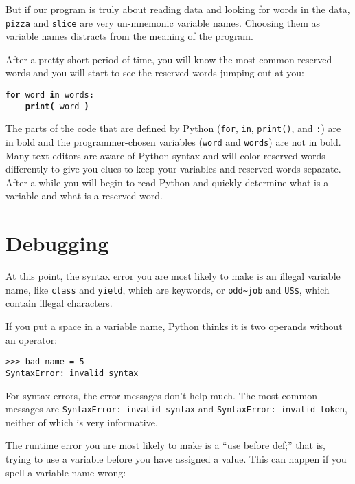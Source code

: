 But if our program is truly about reading data and looking for words in the data,
{\tt pizza} and {\tt slice} are very un-mnemonic variable names.  Choosing them 
as variable names distracts from the meaning of the program.

After a pretty short period of time, you will know the most common reserved words
and you will start to see the reserved words jumping out at you:

{\tt {\bf for} word {\bf in} words{\bf :}\\
\verb"    "{\bf print(} word {\bf )}}

The parts of the code that are defined by 
Python ({\tt for}, {\tt in}, {\tt print()}, and {\tt :}) are in bold
and the programmer-chosen variables ({\tt word} and {\tt words}) are not in bold.  
Many text editors are aware of Python
syntax and will color reserved words differently to give you clues to keep 
your variables and reserved words separate.
After a while you will begin to read Python and quickly determine what
is a variable and what is a reserved word.

\section{Debugging}

At this point, the syntax error you are most likely to make is
an illegal variable name, like {\tt class} and {\tt yield}, which
are keywords, or \verb"odd~job" and \verb"US$", which contain
illegal characters.


If you put a space in a variable name, Python thinks it is two
operands without an operator:

\beforeverb
\begin{verbatim}
>>> bad name = 5
SyntaxError: invalid syntax
\end{verbatim}
\afterverb
%
For syntax errors, the error messages don't help much.
The most common messages are {\tt SyntaxError: invalid syntax} and
{\tt SyntaxError: invalid token}, neither of which is very informative.


The runtime error you are most likely to make is a ``use before
def;'' that is, trying to use a variable before you have assigned
a value.  This can happen if you spell a variable name wrong:


